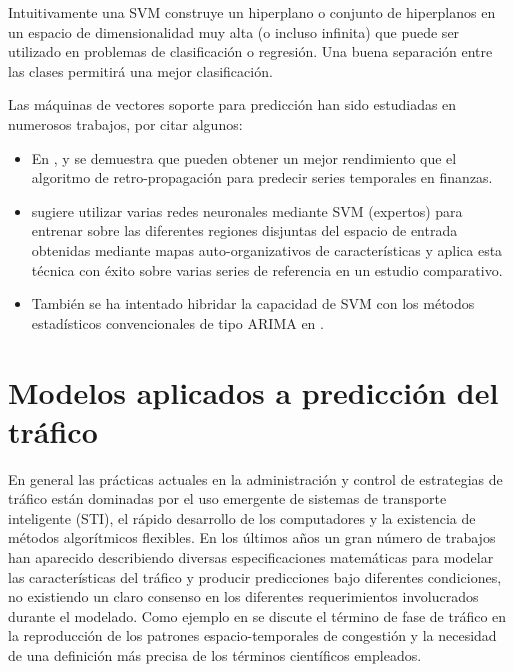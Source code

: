 \documentclass{llncs}
\begin{document}
Intuitivamente una SVM construye un hiperplano o conjunto de hiperplanos en un espacio de dimensionalidad muy alta (o incluso infinita) que puede ser utilizado en problemas de clasificación o regresión. Una buena separación entre las clases permitirá una mejor clasificación.

Las máquinas de vectores soporte para predicción han sido estudiadas en numerosos trabajos, por citar algunos:
\begin{itemize}

\item En \cite{cao2003support}, \cite{Tay2001309} y \cite{kim2003financial} se demuestra que pueden obtener un mejor rendimiento que el algoritmo de retro-propagación para predecir series temporales en finanzas. 
\item \cite{Cao2003321} sugiere utilizar varias redes neuronales mediante SVM (expertos) para entrenar sobre las diferentes regiones disjuntas del espacio de entrada obtenidas mediante mapas auto-organizativos de características y aplica esta técnica con éxito sobre varias series de referencia en un estudio comparativo.
\item También se ha intentado hibridar la capacidad de SVM con los métodos estadísticos convencionales de tipo ARIMA en \cite{pai2005hybrid}.
 
\end{itemize}



\section{Modelos aplicados a predicción del tráfico}

En general las prácticas actuales en la administración y control de estrategias de tráfico están dominadas por el uso emergente de sistemas de transporte inteligente (STI), el rápido desarrollo de los computadores y la existencia de métodos algorítmicos flexibles. En los últimos años un gran número de trabajos han aparecido describiendo diversas especificaciones matemáticas para modelar las características del tráfico y producir predicciones bajo diferentes condiciones, no existiendo un claro consenso en los diferentes requerimientos involucrados durante el modelado.  Como ejemplo en \cite{Treiber2010983} se discute el término de fase de tráfico en la reproducción de los patrones espacio-temporales de congestión y la necesidad de una definición más precisa de los términos científicos empleados. 
\end{document}
